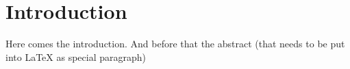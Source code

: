 \section{Introduction}
Here comes the introduction. And before that the abstract (that needs to be put into LaTeX as special paragraph)\newpage %